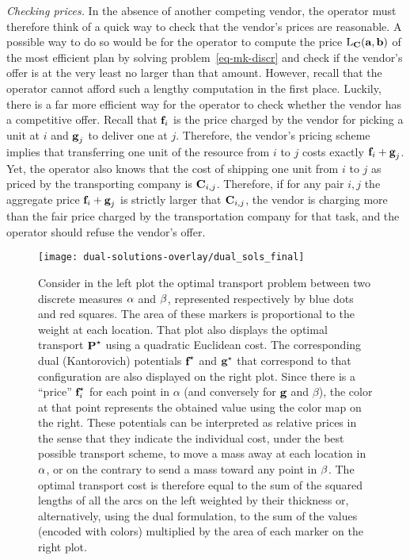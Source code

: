 \begin{rem}
\emph{Checking prices.} In the absence of another competing vendor, the operator must therefore think of a quick way to check that the vendor's prices are reasonable. A possible way to do so would be for the operator to compute the price $\MKD_{\C}(\a,\b)$ of the most efficient plan by solving problem~\eqref{eq-mk-discr} and check if the vendor's offer is at the very least no larger than that amount. However, recall that the operator cannot afford such a lengthy computation in the first place. Luckily, there is a far more efficient way for the operator to check whether the vendor has a competitive offer. Recall that $\fD_i$ is the price charged by the vendor for picking a unit at $i$ and $\gD_j$ to deliver one at $j$. Therefore, the vendor's pricing scheme implies that transferring one unit of the resource from $i$ to $j$ costs exactly $\fD_i+\gD_j$. Yet, the operator also knows that the cost of shipping one unit from $i$ to $j$ as priced by the transporting company is $\C_{i,j}$. Therefore, if for any pair $i,j$ the aggregate price $\fD_i+\gD_j$ is strictly larger that $\C_{i,j}$, the vendor is charging more than the fair price charged by the transportation company for that task, and the operator should refuse the vendor's offer.


\begin{figure}[h!]
\centering
\texttt{[image: dual-solutions-overlay/dual\_sols\_final]}
\caption{\label{dual-solutions-overlay}
Consider in the left plot the optimal transport problem between two discrete measures $\al$ and $\be$, represented respectively by blue dots and red squares. The area of these markers is proportional to the weight at each location. That plot also displays the optimal transport $\P^\star$ using a quadratic Euclidean cost. The corresponding dual (Kantorovich) potentials $\fD^\star$ and $\gD^\star$ that correspond to that configuration are also displayed on the right plot. Since there is a ``price'' $\fD_i^\star$ for each point in $\alpha$ (and conversely for $\gD$ and $\beta$), the color at that point represents the obtained value using the color map on the right. These potentials can be interpreted as relative prices in the sense that they indicate the individual cost, under the best possible transport scheme, to move a mass away at each location in $\al$, or on the contrary to send a mass toward any point in $\be$. The optimal transport cost is therefore equal to the sum of the squared lengths of all the arcs on the left weighted by their thickness or, alternatively, using the dual formulation, to the sum of the values (encoded with colors) multiplied by the area of each marker on the right plot.}
\end{figure}



\end{rem}
